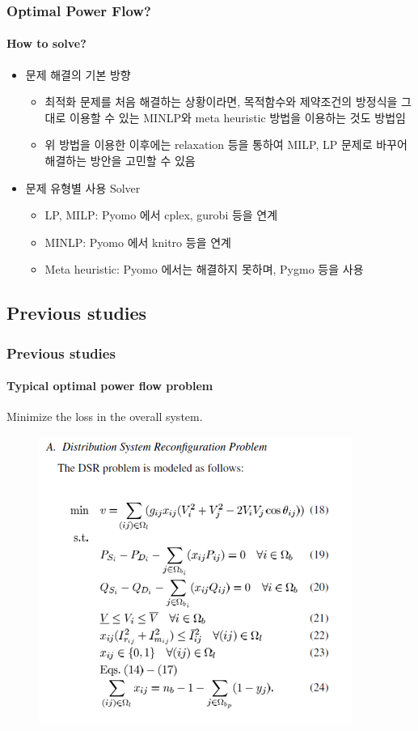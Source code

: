 \documentclass[
	11pt, %
	aspectratio=169, %
]{beamer}
\begin{document}
\begin{frame}
	\frametitle{Optimal Power Flow?}
	\framesubtitle{How to solve?} %
	
	\begin{itemize}
		\item 문제 해결의 기본 방향
		\begin{itemize}
			\item 최적화 문제를 처음 해결하는 상황이라면, 목적함수와 제약조건의 방정식을 그대로 이용할 수 있는 MINLP와 meta heuristic 방법을 이용하는 것도 방법임
			\item 위 방법을 이용한 이후에는 relaxation 등을 통하여 MILP, LP 문제로 바꾸어 해결하는 방안을 고민할 수 있음
		\end{itemize}
		
		\item 문제 유형별 사용 Solver
		\begin{itemize}
			\item LP, MILP: Pyomo 에서 cplex, gurobi 등을 연계
			\item MINLP: Pyomo 에서 knitro 등을 연계
			\item Meta heuristic: Pyomo 에서는 해결하지 못하며, Pygmo 등을 사용
		\end{itemize}

	\end{itemize}
	
\end{frame}


\subsection{Previous studies}

\begin{frame}
	\frametitle{Previous studies}
	\framesubtitle{Typical optimal power flow problem}
	Minimize the loss in the overall system\parencite{5982115}.

	\begin{figure}
		\includegraphics[width=2.5 in,keepaspectratio]{typ_opf.png}
	\end{figure}
	
	
\end{frame}
\end{document}
